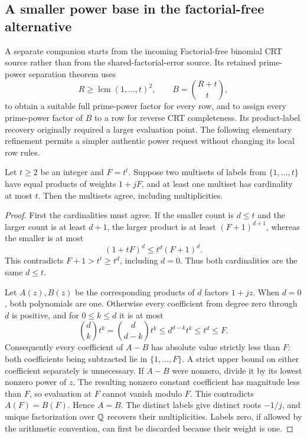 \subsection{A smaller power base in the factorial-free alternative}
A separate companion starts from the incoming Factorial-free binomial CRT
source rather than from the shared-factorial-error source. Its retained
prime-power separation theorem uses
\[
 R\ge\operatorname{lcm}(1,\ldots,t)^2,\qquad
 B=\binom{R+t}{t},
\]
to obtain a suitable full prime-power factor for every row, and to assign
every prime-power factor of $B$ to a row for reverse CRT completeness.
Its product-label recovery originally required a larger evaluation point.
The following elementary refinement permits a simpler authentic power
request without changing its local row rules.

\begin{lemma}\label{lem:power-label}
Let $t\ge2$ be an integer and $F=t^t$. Suppose two multisets of labels
from $\{1,\ldots,t\}$ have equal products of weights $1+jF$, and at
least one multiset has cardinality at most $t$. Then the multisets agree,
including multiplicities.
\end{lemma}
\begin{proof}
First the cardinalities must agree. If the smaller count is $d\le t$
and the larger count is at least $d+1$, the larger product is at least
$(F+1)^{d+1}$, whereas the smaller is at most
\[
 (1+tF)^d\le t^d(F+1)^d.
\]
This contradicts $F+1>t^t\ge t^d$, including $d=0$.
Thus both cardinalities are the same $d\le t$.

Let $A(z),B(z)$ be the corresponding products of $d$ factors $1+jz$.
When $d=0$, both polynomials are one. Otherwise every coefficient from
degree zero through $d$ is positive, and for $0\le k\le d$ it is at most
\[
 \binom dk t^k=\binom d{d-k}t^k
       \le d^{d-k}t^k\le t^d\le F.
\]
Consequently every coefficient of $A-B$ has absolute value strictly less
than $F$: both coefficients being subtracted lie in $\{1,\ldots,F\}$.
A strict upper bound on either coefficient separately is unnecessary.
If $A-B$ were nonzero, divide it by its lowest nonzero power of $z$.
The resulting nonzero constant coefficient has magnitude less than $F$,
so evaluation at $F$ cannot vanish modulo $F$. This contradicts
$A(F)=B(F)$. Hence $A=B$. The distinct labels give distinct roots
$-1/j$, and unique factorization over $\mathbb Q$ recovers their multiplicities.
Labels zero, if allowed by the arithmetic convention, can first be
discarded because their weight is one.
\end{proof}

